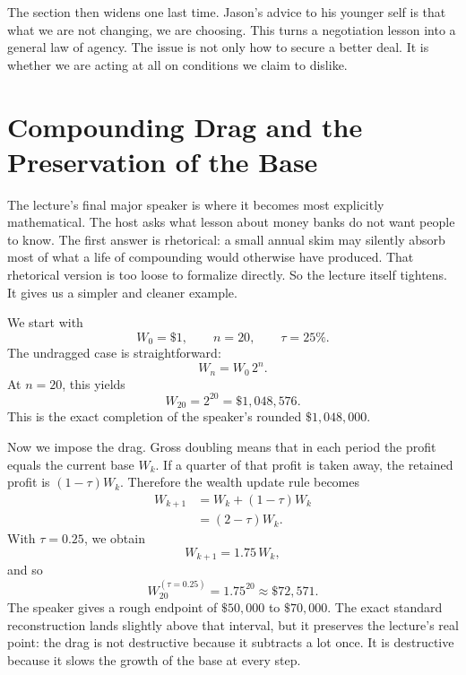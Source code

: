 The section then widens one last time. Jason's advice to his younger self is that what we are not changing, we are choosing. This turns a negotiation lesson into a general law of agency. The issue is not only how to secure a better deal. It is whether we are acting at all on conditions we claim to dislike.

\section{Compounding Drag and the Preservation of the Base}

The lecture's final major speaker is where it becomes most explicitly mathematical. The host asks what lesson about money banks do not want people to know. The first answer is rhetorical: a small annual skim may silently absorb most of what a life of compounding would otherwise have produced. That rhetorical version is too loose to formalize directly. So the lecture itself tightens. It gives us a simpler and cleaner example.

We start with
\begin{equation}
W_0=\$1,
\qquad
n=20,
\qquad
\tau=25\%.
\end{equation}
The undragged case is straightforward:
\begin{equation}
W_n=W_0\,2^n.
\end{equation}
At \(n=20\), this yields
\begin{equation}
W_{20}=2^{20}=\$1{,}048{,}576.
\end{equation}
This is the exact completion of the speaker's rounded \(\$1{,}048{,}000\).

Now we impose the drag. Gross doubling means that in each period the profit equals the current base \(W_k\). If a quarter of that profit is taken away, the retained profit is \((1-\tau)W_k\). Therefore the wealth update rule becomes
\begin{align}
W_{k+1}
&=
W_k+(1-\tau)W_k \\
&=
(2-\tau)W_k.
\end{align}
With \(\tau=0.25\), we obtain
\begin{equation}
W_{k+1}=1.75\,W_k,
\end{equation}
and so
\begin{equation}
W_{20}^{(\tau=0.25)}=1.75^{20}\approx \$72{,}571.
\end{equation}
The speaker gives a rough endpoint of \(\$50{,}000\) to \(\$70{,}000\). The exact standard reconstruction lands slightly above that interval, but it preserves the lecture's real point: the drag is not destructive because it subtracts a lot once. It is destructive because it slows the growth of the base at every step.

